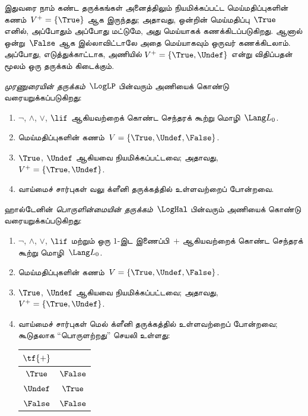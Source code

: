\documentclass[../../../include/open-logic-section]{subfiles}
\begin{document}


இதுவரை நாம் கண்ட தருக்கங்கள் அனைத்திலும் நியமிக்கப்பட்ட மெய்மதிப்புகளின்
கணம்~$V^+ = \{\True\}$ ஆக இருந்தது; அதாவது, ஒன்றின் மெய்மதிப்பு~$\True$
எனில், அப்போதும் அப்போது மட்டுமே, அது மெய்யாகக் கணக்கிடப்படுகிறது. ஆனால்
ஒன்று~$\False$ ஆக இல்லாவிட்டாலே அதை மெய்யாகவும் ஒருவர் கணக்கிடலாம். அப்போது,
எடுத்துக்காட்டாக, அணியில் $V^+ = \{\True, \Undef\}$ என்று விதிப்பதன் மூலம்
ஒரு தருக்கம் கிடைக்கும்.

\begin{defn}
\emph{முரணுரையின் தருக்கம்}~$\LogLP$ பின்வரும் அணியைக் கொண்டு
வரையறுக்கப்படுகிறது:
\begin{enumerate}
  \item $\lnot$, $\land$, $\lor$, $\lif$ ஆகியவற்றைக் கொண்ட செந்தரக்
  கூற்று மொழி~$\Lang L_0$.
  \item மெய்மதிப்புகளின் கணம்~$V = \{\True, \Undef, \False\}$.
  \item $\True$, $\Undef$ ஆகியவை நியமிக்கப்பட்டவை; அதாவது,
  $V^+ = \{\True, \Undef\}$.
  \item வாய்மைச் சார்புகள் வலு க்ளீனி தருக்கத்தில் உள்ளவற்றைப் போன்றவை.
\end{enumerate}
\end{defn}

\begin{defn}
ஹால்டேனின் \emph{பொருளின்மையின் தருக்கம்}~$\LogHal$ பின்வரும் அணியைக் கொண்டு
வரையறுக்கப்படுகிறது:
\begin{enumerate}
  \item $\lnot$, $\land$, $\lor$, $\lif$ மற்றும் ஒரு $1$-இட இணைப்பி~$+$
  ஆகியவற்றைக் கொண்ட செந்தரக் கூற்று மொழி~$\Lang L_0$.
  \item மெய்மதிப்புகளின் கணம்~$V = \{\True, \Undef, \False\}$.
  \item $\True$, $\Undef$ ஆகியவை நியமிக்கப்பட்டவை; அதாவது,
  $V^+ = \{\True, \Undef\}$.
  \item வாய்மைச் சார்புகள் மெல் க்ளீனி தருக்கத்தில் உள்ளவற்றைப் போன்றவை;
  கூடுதலாக ``பொருளற்றது'' செயலி உள்ளது:
  \begin{center}
    \begin{tabular}{c|c}
    $\tf{+}$ & \\
    \hline
    $\True$ & $\False$ \\
    $\Undef$ & $\True$ \\
    $\False$ & $\False$
    \end{tabular}
  \end{center}
\end{enumerate}
\end{defn}
\end{document}
